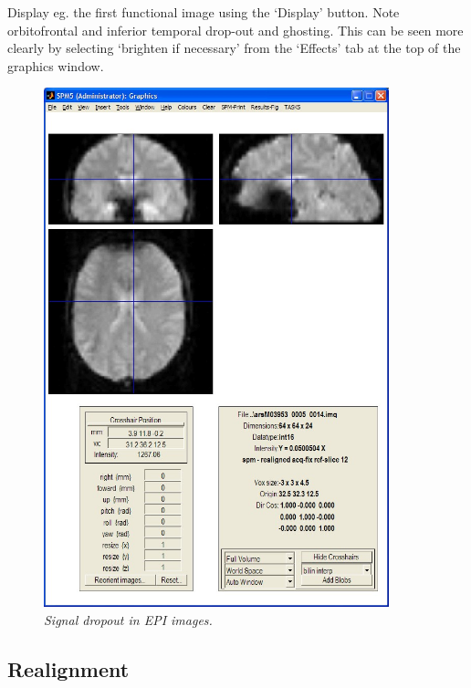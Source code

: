 Display eg. the first functional image using the 
`Display' button. Note orbitofrontal 
  and inferior temporal drop-out and ghosting. This 
  can be seen more clearly by selecting `brighten if necessary' from the `Effects' tab at the top of the 
  graphics window.
  \begin{figure}
\begin{center}
\includegraphics[width=100mm]{faces/dropout}
\caption{\em Signal dropout in EPI images. \label{dropout}}
\end{center}
\end{figure}

\subsection{Realignment}

